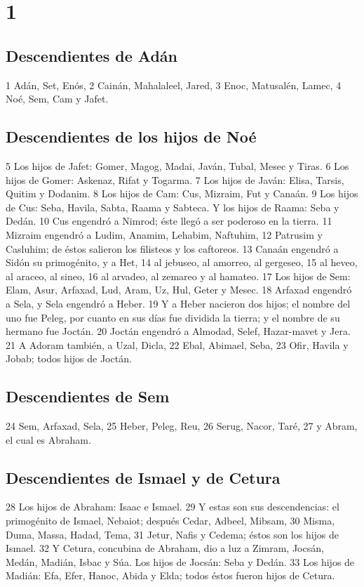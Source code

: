 
\chapter{1}

\section*{Descendientes de Adán}

1 Adán, Set, Enós,
2 Cainán, Mahalaleel, Jared,
3 Enoc, Matusalén, Lamec,
4 Noé, Sem, Cam y Jafet.
\section*{Descendientes de los hijos de Noé}

5 Los hijos de Jafet: Gomer, Magog, Madai, Javán, Tubal, Mesec y Tiras.
6 Los hijos de Gomer: Askenaz, Rifat y Togarma.
7 Los hijos de Javán: Elisa, Tarsis, Quitim y Dodanim.
8 Los hijos de Cam: Cus, Mizraim, Fut y Canaán.
9 Los hijos de Cus: Seba, Havila, Sabta, Raama y Sabteca. Y los hijos de Raama: Seba y Dedán.
10 Cus engendró a Nimrod; éste llegó a ser poderoso en la tierra.
11 Mizraim engendró a Ludim, Anamim, Lehabim, Naftuhim,
12 Patrusim y Casluhim; de éstos salieron los filisteos y los caftoreos.
13 Canaán engendró a Sidón su primogénito, y a Het,
14 al jebuseo, al amorreo, al gergeseo,
15 al heveo, al araceo, al sineo,
16 al arvadeo, al zemareo y al hamateo.
17 Los hijos de Sem: Elam, Asur, Arfaxad, Lud, Aram, Uz, Hul, Geter y Mesec.
18 Arfaxad engendró a Sela, y Sela engendró a Heber.
19 Y a Heber nacieron dos hijos; el nombre del uno fue Peleg, por cuanto en sus días fue dividida la tierra; y el nombre de su hermano fue Joctán.
20 Joctán engendró a Almodad, Selef, Hazar-mavet y Jera.
21 A Adoram también, a Uzal, Dicla,
22 Ebal, Abimael, Seba,
23 Ofir, Havila y Jobab; todos hijos de Joctán.
\section*{Descendientes de Sem }

24 Sem, Arfaxad, Sela,
25 Heber, Peleg, Reu, 
26 Serug, Nacor, Taré,
27 y Abram, el cual es Abraham.
\section*{Descendientes de Ismael y de Cetura }

28 Los hijos de Abraham: Isaac e Ismael.
29 Y estas son sus descendencias: el primogénito de Ismael, Nebaiot; después Cedar, Adbeel, Mibsam,
30 Misma, Duma, Massa, Hadad, Tema,
31 Jetur, Nafis y Cedema; éstos son los hijos de Ismael.
32 Y Cetura, concubina de Abraham, dio a luz a Zimram, Jocsán, Medán, Madián, Isbac y Súa. Los hijos de Jocsán: Seba y Dedán.
33 Los hijos de Madián: Efa, Efer, Hanoc, Abida y Elda; todos éstos fueron hijos de Cetura.
